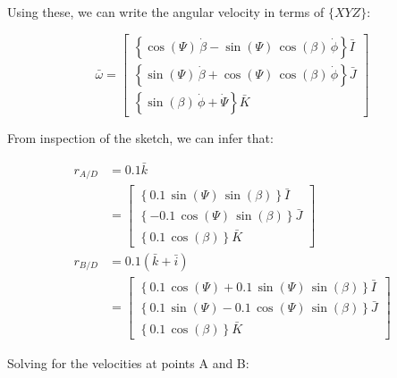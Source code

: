 \documentclass[12pt, letterpaper]{../assignment}
\begin{document}
Using these, we can write the angular velocity in terms of $\{XYZ\}$:

$$ \bar{\omega} =
\left[\begin{array}{r}
    \left\{\cos\left(\Psi\right)\,\dot{\beta}-\sin\left(\Psi\right)\,\cos\left(\beta\right)\,\dot{\phi}\right\}\bar{I}\\
    \left\{\sin\left(\Psi\right)\,\dot{\beta}+\cos\left(\Psi\right)\,\cos\left(\beta\right)\,\dot{\phi}\right\}\bar{J}\\
    \left\{\sin\left(\beta\right)\,\dot{\phi}+\dot{\Psi}\right\}\bar{K}
\end{array}\right] $$

From inspection of the sketch, we can infer that:

\begin{equation*}
    \begin{aligned}
        r_{A/D} &= 0.1 \bar{k}\\
                &= \left[\begin{array}{r}
                    \left\{0.1\,\sin\left(\Psi\right)\,\sin\left(\beta\right)\right\}\bar{I}\\
                    \left\{-0.1\,\cos\left(\Psi\right)\,\sin\left(\beta\right)\right\}\bar{J}\\
                    \left\{0.1\,\cos\left(\beta\right)\right\}\bar{K}
                \end{array}\right]\\
        r_{B/D} &= 0.1 \left(\bar{k} + \bar{i}\right)\\
                &= \left[\begin{array}{r}
                    \left\{0.1\,\cos\left(\Psi\right)+0.1\,\sin\left(\Psi\right)\,\sin\left(\beta\right)\right\}\bar{I}\\
                    \left\{0.1\,\sin\left(\Psi\right)-0.1\,\cos\left(\Psi\right)\,\sin\left(\beta\right)\right\}\bar{J}\\
                    \left\{0.1\,\cos\left(\beta\right)\right\}\bar{K}
                \end{array}\right]
    \end{aligned}
\end{equation*}

Solving for the velocities at points A and B:
\end{document}
